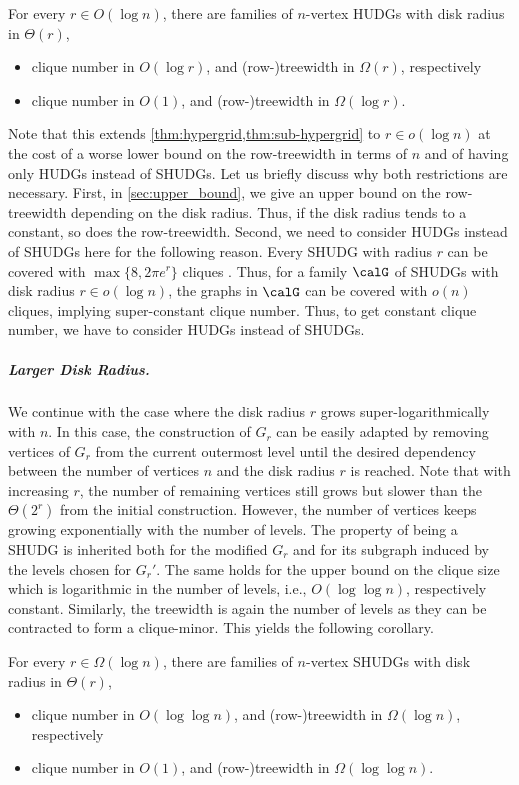 %
\begin{corollary}
    \label{cor:lower-bound-sub-log-radius}
    For every $r \in O(\log n)$, there are families of $n$-vertex HUDGs with disk radius in $\Theta(r)$, 
    \begin{itemize}
        \item clique number in $ O(\log r) $, and (row-)treewidth in $ \Omega(r) $, respectively
        \item clique number in $ O(1) $, and (row-)treewidth in $ \Omega(\log r) $.
    \end{itemize}
%
\end{corollary}
%
Note that this extends \cref{thm:hypergrid,thm:sub-hypergrid} to $ r \in o(\log n) $ at the cost of a worse lower bound on the row-treewidth in terms of $ n $ and of having only HUDGs instead of SHUDGs.
Let us briefly discuss why both restrictions are necessary.
First, in \cref{sec:upper_bound}, we give an upper bound on the row-treewidth depending on the disk radius.
Thus, if the disk radius tends to a constant, so does the row-treewidth.
%
Second, we need to consider HUDGs instead of SHUDGs here for the following reason.
Every SHUDG with radius $ r $ can be covered with $\max\{8, 2\pi e^r\}$ cliques \cite[Lemma~8]{blasius_strongly_2023}.
Thus, for a family $\calG$ of SHUDGs with disk radius $r \in o(\log n)$, the graphs in $\calG$ can be covered with $o(n)$ cliques, implying super-constant clique number.  Thus, to get constant clique number, we have to consider HUDGs instead of SHUDGs.
%
%
\subparagraph{Larger Disk Radius.}
%
We continue with the case where the disk radius $r$ grows super-logarithmically with $n$.
In this case, the construction of $G_r$ can be easily adapted by removing vertices of $G_r$ from the current outermost level until the desired dependency between the number of vertices $n$ and the disk radius $r$ is reached.
Note that with increasing $ r $, the number of remaining vertices still grows but slower than the $ \Theta(2^r) $ from the initial construction.
However, the number of vertices keeps growing exponentially with the number of levels.
The property of being a SHUDG is inherited both for the modified $ G_r $ and for its subgraph induced by the levels chosen for $ G_r' $.
The same holds for the upper bound on the clique size which is logarithmic in the number of levels, i.e., $ O(\log \log n) $, respectively constant.
Similarly, the treewidth is again the number of levels as they can be contracted to form a clique-minor.
This yields the following corollary.
%
\begin{corollary}
    \label{cor:lower-bound-super-log-radius}
    For every $r \in \Omega(\log n)$, there are families of $n$-vertex SHUDGs with disk radius in $\Theta(r)$, 
    \begin{itemize}
        \item clique number in $O(\log\log n)$, and (row-)treewidth in $\Omega(\log n)$, respectively
        \item clique number in $O(1)$, and (row-)treewidth in $\Omega(\log\log n)$.
    \end{itemize}
%
\end{corollary}
